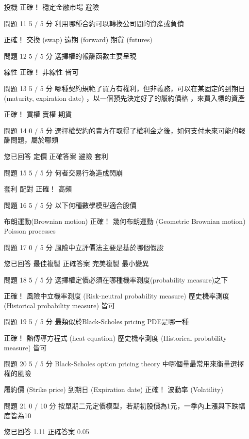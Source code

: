   投機 
正確！
  穩定金融市場 
  避險 
 
問題 11
5 / 5 分
利用哪種合約可以轉換公司間的資產或負債

正確！
  交換 (swap) 
  遠期 (forward) 
  期貨 (futures) 
 
問題 12
5 / 5 分
選擇權的報酬函數主要呈現

  線性 
正確！
  非線性 
  皆可 
 
問題 13
5 / 5 分
哪種契約規範了買方有權利，但非義務，可以在某固定的到期日 (maturity, expiration date) ，以一個預先決定好了的履約價格 ，來買入標的資產

正確！
  買權 
  賣權 
  期貨 
 
問題 14
0 / 5 分
選擇權契約的賣方在取得了權利金之後，如何支付未來可能的報酬問題，屬於哪類

您已回答
  定價 
正確答案
  避險 
  套利 
 
問題 15
5 / 5 分
何者交易行為造成閃崩

  套利 
  配對 
正確！
  高頻 
 
問題 16
5 / 5 分
以下何種數學模型適合股價

  布朗運動(Brownian motion) 
正確！
  幾何布朗運動 (Geometric Brownian motion) 
  Poisson processes 
 
問題 17
0 / 5 分
風險中立評價法主要是基於哪個假設

您已回答
  最佳複製 
正確答案
  完美複製 
  最小變異 
 
問題 18
5 / 5 分
選擇權定價必須在哪種機率測度(probability measure)之下

正確！
  風險中立機率測度 (Risk-neutral probability measure) 
  歷史機率測度 (Historical probability measure) 
  皆可 
 
問題 19
5 / 5 分
最類似於Black-Scholes pricing PDE是哪一種

正確！
  熱傳導方程式 (heat equation) 
  歷史機率測度 (Historical probability measure) 
  皆可 
 
問題 20
5 / 5 分
Black-Scholes option pricing theory 中哪個量最常用來衡量選擇權的風險

  履約價 (Strike price) 
  到期日 (Expiration date) 
正確！
  波動率 (Volatility) 
 
問題 21
0 / 10 分
按單期二元定價模型，若期初股價為1元，一季內上漲與下跌幅度皆為10%

 

您已回答
1.11
正確答案
0.05 

